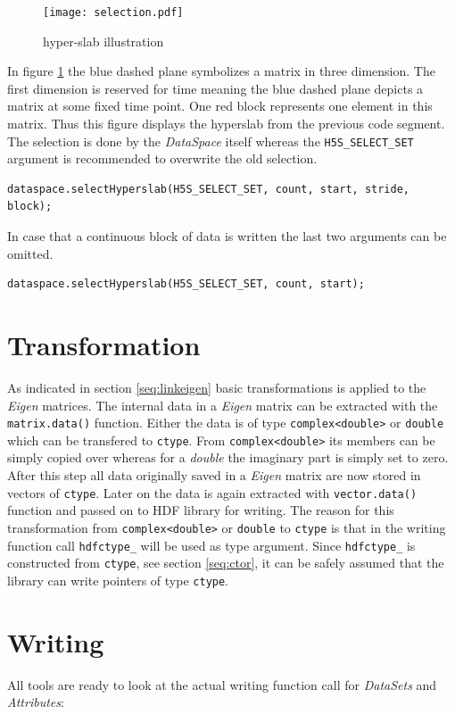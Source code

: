 \begin{figure}[ht!]
\centering
\texttt{[image: selection.pdf]}
\caption{hyper-slab illustration}
\label{fig:hyperslab}
\end{figure}
In figure \ref{fig:hyperslab} the blue dashed plane symbolizes a matrix in three dimension. The first dimension is reserved for time meaning the blue dashed plane depicts a matrix at some fixed time point. One red block represents one element in this matrix. Thus this figure displays the hyperslab from the previous code segment. The selection is done by the \textit{DataSpace} itself whereas the \texttt{H5S\_SELECT\_SET} argument is recommended to overwrite the old selection.
\begin{lstlisting}
dataspace.selectHyperslab(H5S_SELECT_SET, count, start, stride, block);
\end{lstlisting}
In case that a continuous block of data is written the last two arguments can be omitted.
\begin{lstlisting}
dataspace.selectHyperslab(H5S_SELECT_SET, count, start);
\end{lstlisting}


\section{Transformation}
\label{seq:transform}
As indicated in section \ref{seq:linkeigen} basic transformations is applied to the \textit{Eigen} matrices. The internal data in a \textit{Eigen} matrix can be extracted with the \texttt{matrix.data()} function. Either the data is of type \texttt{complex<double>} or \texttt{double} which can be transfered to \texttt{ctype}. From \texttt{complex<double>} its members can be simply copied over whereas for a \textit{double} the imaginary part is simply set to zero. After this step all data originally saved in a \textit{Eigen} matrix are now stored in vectors of \texttt{ctype}. Later on the data is again extracted with \texttt{vector.data()} function and passed on to HDF library for writing. The reason for this transformation from \texttt{complex<double>} or \texttt{double} to \texttt{ctype} is that in the writing function call \texttt{hdfctype\_} will be used as type argument. Since \texttt{hdfctype\_} is constructed from \texttt{ctype}, see section \ref{seq:ctor}, it can be safely assumed that the library can write pointers of type \texttt{ctype}.

\section{Writing}
\label{seq:writing}
All tools are ready to look at the actual writing function call for \textit{DataSets} and \textit{Attributes}:
 
